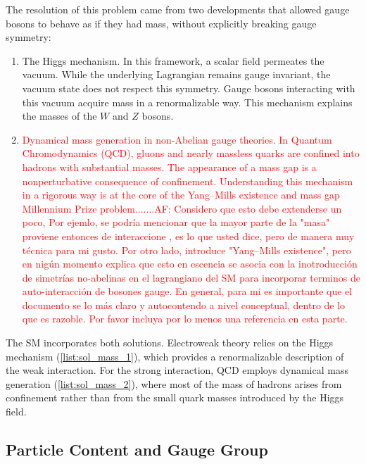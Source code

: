 The resolution of this problem came from two developments that allowed gauge bosons to behave as if they had mass, without explicitly breaking gauge symmetry:
\begin{enumerate}
    \item \label{list:sol_mass_1} The Higgs mechanism. In this framework, a scalar field permeates the vacuum. While the underlying Lagrangian remains gauge invariant, the vacuum state does not respect this symmetry. Gauge bosons interacting with this vacuum acquire mass in a renormalizable way. This mechanism explains the masses of the $W$ and $Z$ bosons.
    \item \label{list:sol_mass_2} \textcolor{red}{Dynamical mass generation in non-Abelian gauge theories. In Quantum Chromodynamics (QCD), gluons and nearly massless quarks are confined into hadrons with substantial masses. The appearance of a mass gap is a nonperturbative consequence of confinement. Understanding this mechanism in a rigorous way is at the core of the Yang–Mills existence and mass gap Millennium Prize problem.......AF: Considero que esto debe extenderse un poco, Por ejemlo, se podría mencionar que la mayor parte de la "masa" proviene entonces de interaccione , es lo que usted dice, pero de manera muy técnica para mi gusto. Por otro lado, introduce "Yang–Mills existence", pero en nigún momento explica que esto en escencia se asocia con la inotroducción de simetrías no-abelinas en el lagrangiano del SM para incorporar terminos de auto-interacción de bosones gauge. En general, para mi es importante que el documento se lo más claro y autocontendo a nivel conceptual, dentro de lo que es razoble. Por favor incluya por lo menos una referencia en esta parte.}
\end{enumerate}

The SM incorporates both solutions. Electroweak theory relies on the Higgs mechanism (\ref{list:sol_mass_1}), which provides a renormalizable description of the weak interaction. For the strong interaction, QCD employs dynamical mass generation (\ref{list:sol_mass_2}), where most of the mass of hadrons arises from confinement rather than from the small quark masses introduced by the Higgs field.

\subsection{Particle Content and Gauge Group}
\label{sec:particlecontent}

